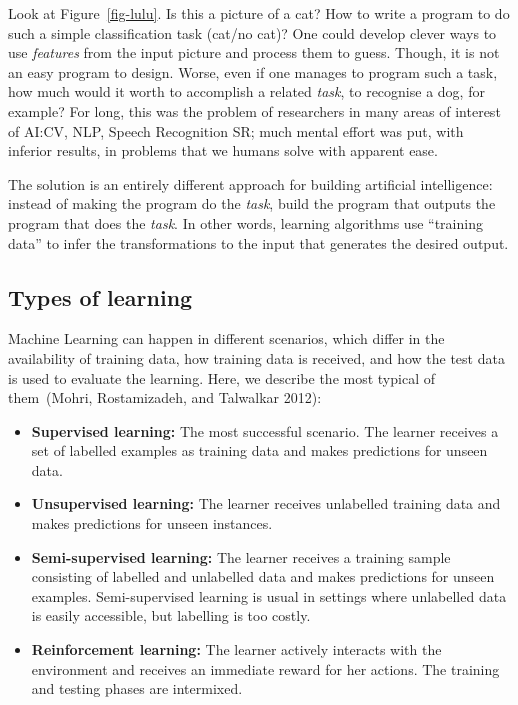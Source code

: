 \documentclass[
  letterpaper,
  12pt,
  british]{tufte-book}
\theoremstyle{plain}
\theoremstyle{definition}
\theoremstyle{plain}
\theoremstyle{remark}
\begin{document}
Look at Figure~\ref{fig-lulu}. Is this a picture of a cat? How to write
a program to do such a simple classification task (cat/no cat)? One
could develop clever ways to use \emph{features} from the input picture
and process them to guess. Though, it is not an easy program to design.
Worse, even if one manages to program such a task, how much would it
worth to accomplish a related \emph{task}, to recognise a dog, for
example? For long, this was the problem of researchers in many areas of
interest of AI:{CV}, {NLP}, Speech Recognition {SR}; much mental effort
was put, with inferior results, in problems that we humans solve with
apparent ease.

The solution is an entirely different approach for building artificial
intelligence: instead of making the program do the \emph{task}, build
the program that outputs the program that does the \emph{task}. In other
words, learning algorithms use ``training data'' to infer the
transformations to the input that generates the desired output.

\hypertarget{types-of-learning}{%
\subsection{Types of learning}\label{types-of-learning}}

Machine Learning can happen in different scenarios, which differ in the
availability of training data, how training data is received, and how
the test data is used to evaluate the learning. Here, we describe the
most typical of them~(Mohri, Rostamizadeh, and Talwalkar
2012):

\begin{itemize}
\item
  \textbf{Supervised learning:} The most successful scenario. The
  learner receives a set of labelled examples as training data and makes
  predictions for unseen data.
\item
  \textbf{Unsupervised learning:} The learner receives unlabelled
  training data and makes predictions for unseen instances.
\item
  \textbf{Semi-supervised learning:} The learner receives a training
  sample consisting of labelled and unlabelled data and makes
  predictions for unseen examples. Semi-supervised learning is usual in
  settings where unlabelled data is easily accessible, but labelling is
  too costly.
\item
  \textbf{Reinforcement learning:} The learner actively interacts with
  the environment and receives an immediate reward for her actions. The
  training and testing phases are intermixed.
\end{itemize}
\end{document}
